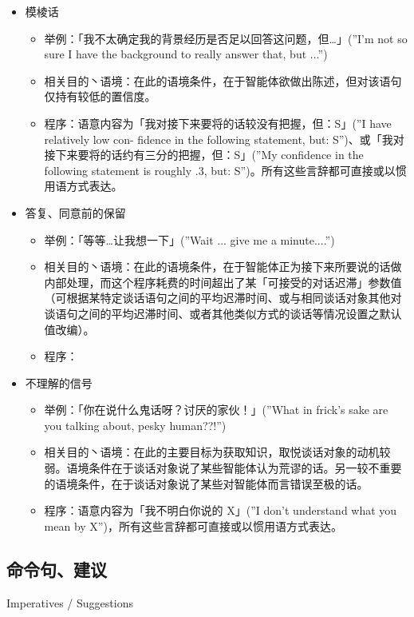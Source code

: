 \begin{itemize}
\item 模棱话
\begin{itemize}
\item 举例：「我不太确定我的背景经历是否足以回答这问题，但…」(”I’m not so sure I have the background to really answer that, but ...”)
\item 相关目的丶语境：在此的语境条件，在于智能体欲做出陈述，但对该语句仅持有较低的置信度。
\item 程序：语意内容为「我对接下来要将的话较没有把握，但：S」(”I have relatively low con- fidence in the following statement, but: S”)、或「我对接下来要将的话约有三分的把握，但：S」(”My confidence in the following statement is roughly .3, but: S”)。所有这些言辞都可直接或以惯用语方式表达。
\end{itemize}
\item 答复、同意前的保留
\begin{itemize}
\item 举例：「等等…让我想一下」(”Wait ... give me a minute....”)
\item 相关目的丶语境：在此的语境条件，在于智能体正为接下来所要说的话做内部处理，而这个程序耗费的时间超出了某「可接受的对话迟滞」参数值（可根据某特定谈话语句之间的平均迟滞时间、或与相同谈话对象其他对谈语句之间的平均迟滞时间、或者其他类似方式的谈话等情况设置之默认值改编）。 
\item 程序：
\end{itemize}


\item 不理解的信号
\begin{itemize}
\item 举例：「你在说什么鬼话呀？讨厌的家伙！」(”What in frick’s sake are you talking about, pesky human??!”)
\item 相关目的丶语境：在此的主要目标为获取知识，取悦谈话对象的动机较弱。语境条件在于谈话对象说了某些智能体认为荒谬的话。另一较不重要的语境条件，在于谈话对象说了某些对智能体而言错误至极的话。
\item 程序：语意内容为「我不明白你说的 X」(”I don’t understand what you mean by X”)，所有这些言辞都可直接或以惯用语方式表达。
\end{itemize}

\end{itemize}

\subsection{命令句、建议}{Imperatives / Suggestions}


